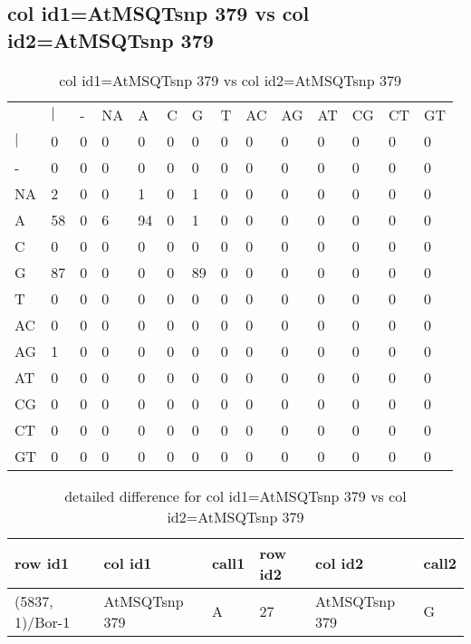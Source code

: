 \subsection{col id1=AtMSQTsnp 379 vs col id2=AtMSQTsnp 379}
\begin{center}
\begin{longtable}{|l|l|l|l|l|l|l|l|l|l|l|l|l|l|}
\caption{col id1=AtMSQTsnp 379 vs col id2=AtMSQTsnp 379} \label{table_dm890}\\
\hline
\\
\hline
&$|$&-&NA&A&C&G&T&AC&AG&AT&CG&CT&GT\\
$|$&0&0&0&0&0&0&0&0&0&0&0&0&0\\
-&0&0&0&0&0&0&0&0&0&0&0&0&0\\
NA&2&0&0&1&0&1&0&0&0&0&0&0&0\\
A&58&0&6&94&0&1&0&0&0&0&0&0&0\\
C&0&0&0&0&0&0&0&0&0&0&0&0&0\\
G&87&0&0&0&0&89&0&0&0&0&0&0&0\\
T&0&0&0&0&0&0&0&0&0&0&0&0&0\\
AC&0&0&0&0&0&0&0&0&0&0&0&0&0\\
AG&1&0&0&0&0&0&0&0&0&0&0&0&0\\
AT&0&0&0&0&0&0&0&0&0&0&0&0&0\\
CG&0&0&0&0&0&0&0&0&0&0&0&0&0\\
CT&0&0&0&0&0&0&0&0&0&0&0&0&0\\
GT&0&0&0&0&0&0&0&0&0&0&0&0&0\\
\hline
\end{longtable}
\end{center}

\begin{center}
\begin{longtable}{|l|l|l|l|l|l|}
\caption{detailed difference for col id1=AtMSQTsnp 379 vs col id2=AtMSQTsnp 379} \label{table_dm891}\\
\hline
row id1&col id1&call1&row id2&col id2&call2\\
\hline
(5837, 1)/Bor-1&AtMSQTsnp 379&A&27&AtMSQTsnp 379&G\\
\hline
\end{longtable}
\end{center}

